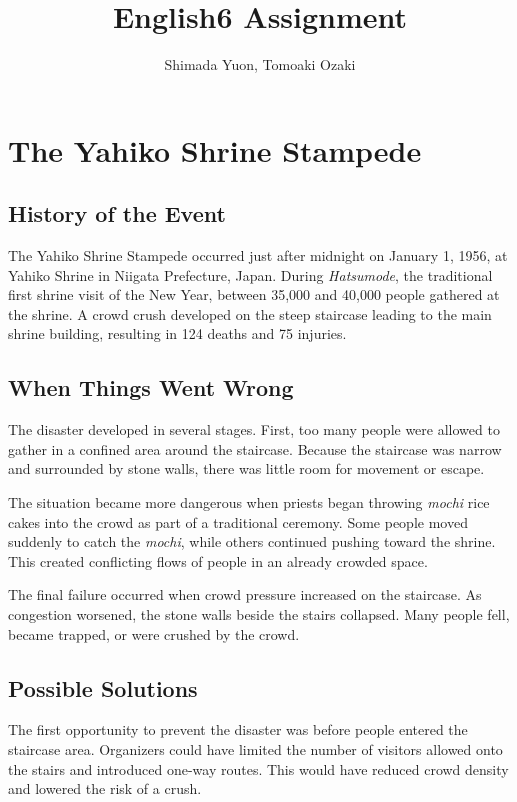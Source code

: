 \documentclass[platex,dvipdfmx,a4paper]{article}
\title{English6 Assignment}
\author{Shimada Yuon, Tomoaki Ozaki}
\begin{document}
  \maketitle
  \section*{The Yahiko Shrine Stampede}

  \subsection*{History of the Event}
  
  The Yahiko Shrine Stampede occurred just after midnight on January 1, 1956, at Yahiko Shrine in Niigata Prefecture, Japan. During \textit{Hatsumode}, the traditional first shrine visit of the New Year, between 35,000 and 40,000 people gathered at the shrine. A crowd crush developed on the steep staircase leading to the main shrine building, resulting in 124 deaths and 75 injuries.
  
  \subsection*{When Things Went Wrong}
  
  The disaster developed in several stages. First, too many people were allowed to gather in a confined area around the staircase. Because the staircase was narrow and surrounded by stone walls, there was little room for movement or escape.
  
  The situation became more dangerous when priests began throwing \textit{mochi} rice cakes into the crowd as part of a traditional ceremony. Some people moved suddenly to catch the \textit{mochi}, while others continued pushing toward the shrine. This created conflicting flows of people in an already crowded space.
  
  The final failure occurred when crowd pressure increased on the staircase. As congestion worsened, the stone walls beside the stairs collapsed. Many people fell, became trapped, or were crushed by the crowd.
  
  \subsection*{Possible Solutions}
  
  The first opportunity to prevent the disaster was before people entered the staircase area. Organizers could have limited the number of visitors allowed onto the stairs and introduced one-way routes. This would have reduced crowd density and lowered the risk of a crush.
  
\end{document}
